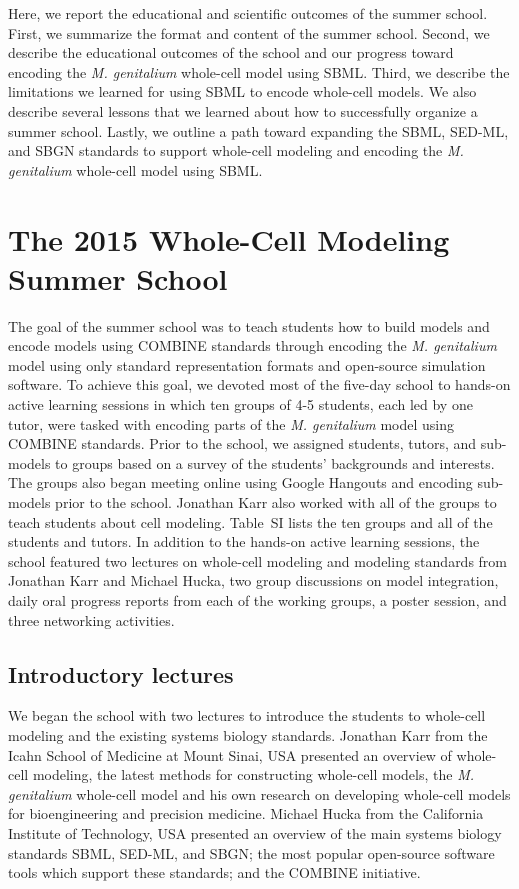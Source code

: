 \documentclass[journal,transmag]{IEEEtran}
\begin{document}
Here, we report the educational and scientific outcomes of the summer school. 
First, we summarize the format and content of the summer school. 
Second, we describe the educational outcomes of the school and our progress toward encoding the \textit{M. genitalium} whole-cell model using SBML. 
Third, we describe the limitations we learned for using SBML to encode whole-cell models. We also describe several lessons that we learned about how to successfully organize a summer school. 
Lastly, we outline a path toward expanding the SBML, SED-ML, and SBGN standards to support whole-cell modeling and encoding the \textit{M. genitalium} whole-cell model using SBML.

\section{The 2015 Whole-Cell Modeling Summer School}
The goal of the summer school was to teach students how to build models and encode models using COMBINE standards through encoding the \textit{M. genitalium} model using only standard representation formats and open-source simulation software. 
To achieve this goal, we devoted most of the five-day school to hands-on active learning sessions in which ten groups of 4-5 students, each led by one tutor, were tasked with encoding parts of the \textit{M. genitalium} model using COMBINE standards. 
Prior to the school, we assigned students, tutors, and sub-models to groups based on a survey of the students' backgrounds and interests. 
The groups also began meeting online using Google Hangouts and encoding sub-models prior to the school. 
Jonathan Karr also worked with all of the groups to teach students about cell modeling. 
Table~SI lists the ten groups and all of the students and tutors. 
In addition to the hands-on active learning sessions, the school featured two lectures on whole-cell modeling and modeling standards from Jonathan Karr and Michael Hucka, two group discussions on model integration, daily oral progress reports from each of the working groups, a poster session, and three networking activities.

\subsection{Introductory lectures}
We began the school with two lectures to introduce the students to whole-cell modeling and the existing systems biology standards. Jonathan Karr from the Icahn School of Medicine at Mount Sinai, USA presented an overview of whole-cell modeling, the latest methods for constructing whole-cell models, the \textit{M. genitalium} whole-cell model and his own research on developing whole-cell models for bioengineering and precision medicine. Michael Hucka from the California Institute of Technology, USA presented an overview of the main systems biology standards SBML, SED-ML, and SBGN; the most popular open-source software tools which support these standards; and the COMBINE initiative.
\end{document}
